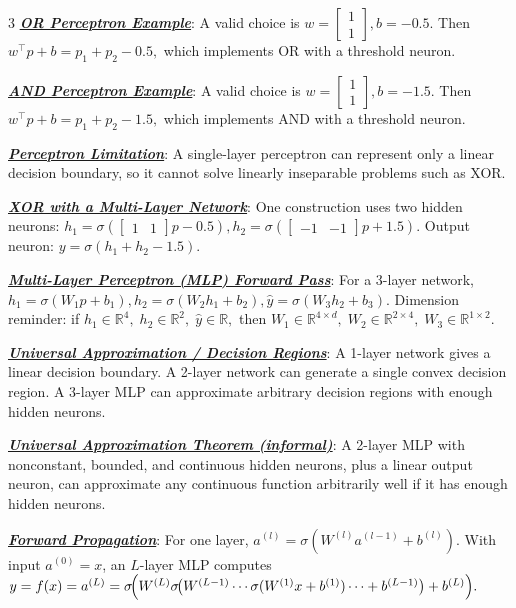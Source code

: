 \documentclass[12pt]{article}
\newcommand{\bulletPoint}[1]{\underline{\textit{\textbf{#1}}}}
\begin{document}
\begin{multicols*}{3}
\bulletPoint{OR Perceptron Example}:
A valid choice is
$w=\begin{bmatrix}1\\1\end{bmatrix}, b=-0.5.$
Then
$w^\top p+b=p_1+p_2-0.5,$
which implements OR with a threshold neuron.

\bulletPoint{AND Perceptron Example}:
A valid choice is
$w=\begin{bmatrix}1\\1\end{bmatrix}, b=-1.5.$
Then
$w^\top p+b=p_1+p_2-1.5,$
which implements AND with a threshold neuron.

\bulletPoint{Perceptron Limitation}:
A single-layer perceptron can represent only a linear decision boundary, so it cannot solve linearly inseparable problems such as XOR.

\bulletPoint{XOR with a Multi-Layer Network}:
One construction uses two hidden neurons:
$h_1=\sigma\!\left(\begin{bmatrix}1&1\end{bmatrix}p-0.5\right),
h_2=\sigma\!\left(\begin{bmatrix}-1&-1\end{bmatrix}p+1.5\right).$
Output neuron:
$y=\sigma(h_1+h_2-1.5).$

\bulletPoint{Multi-Layer Perceptron (MLP) Forward Pass}:
For a 3-layer network,
\textcolor{blue!50!black}{$\textstyle
h_1=\sigma(W_1p+b_1),
h_2=\sigma(W_2h_1+b_2),
\hat y=\sigma(W_3h_2+b_3).
$}
Dimension reminder:
if $h_1\in\mathbb R^4,\; h_2\in\mathbb R^2,\; \hat y\in\mathbb R,$ then
$W_1\in\mathbb R^{4\times d},\; W_2\in\mathbb R^{2\times 4},\; W_3\in\mathbb R^{1\times 2}.$



\bulletPoint{Universal Approximation / Decision Regions}:
A 1-layer network gives a linear decision boundary.
A 2-layer network can generate a single convex decision region.
A 3-layer MLP can approximate arbitrary decision regions with enough hidden neurons.

\bulletPoint{Universal Approximation Theorem (informal)}:
A 2-layer MLP with nonconstant, bounded, and continuous hidden neurons, plus a linear output neuron, can approximate any continuous function arbitrarily well if it has enough hidden neurons.




\bulletPoint{Forward Propagation}:
For one layer,
$a^{(l)}=\sigma\!\left(W^{(l)}a^{(l-1)}+b^{(l)}\right).$
With input $a^{(0)}=x$, an $L$-layer MLP computes
\textcolor{blue!50!black}{$\textstyle
y=f(x)=a^{(L)}
=\sigma\!\Bigl(W^{(L)}\sigma\!\bigl(W^{(L-1)}\cdots \sigma(W^{(1)}x+b^{(1)})\cdots +b^{(L-1)}\bigr)+b^{(L)}\Bigr).
$}


\end{multicols*}
\end{document}
